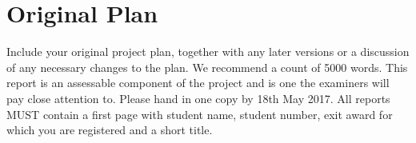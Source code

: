 \section{Original Plan}\label{original-plan}

Include your original project plan, together with any later versions or
a discussion of any necessary changes to the plan. We recommend a count
of 5000 words. This report is an assessable component of the project and
is one the examiners will pay close attention to. Please hand in one
copy by 18th May 2017. All reports MUST contain a first page with
student name, student number, exit award for which you are registered
and a short title.
